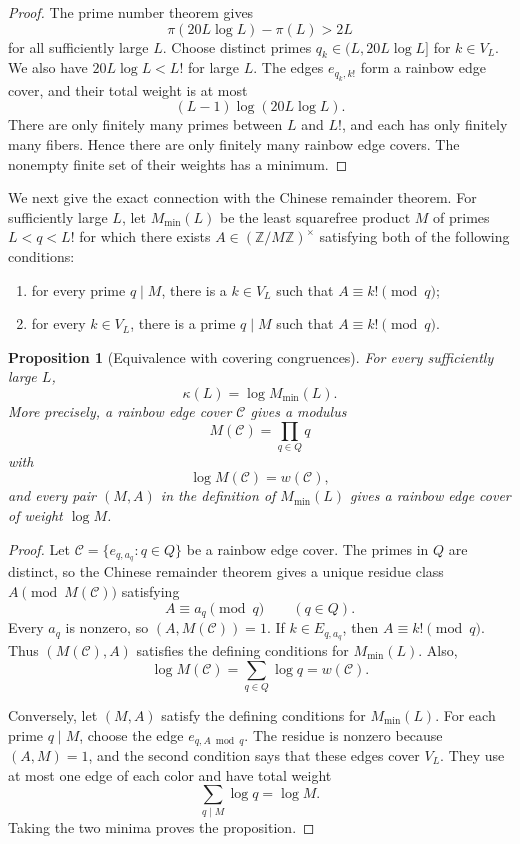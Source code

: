 \documentclass[11pt]{amsart}
\newtheorem{proposition}[theorem]{Proposition}
\theoremstyle{definition}
\theoremstyle{remark}
\begin{document}
\begin{proof}
The prime number theorem gives
\[
\pi(20L\log L)-\pi(L)>2L
\]
for all sufficiently large $L$.  Choose distinct primes
$q_k\in(L,20L\log L]$ for $k\in V_L$.  We also have
$20L\log L<L!$ for large $L$.  The edges $e_{q_k,k!}$ form a rainbow edge
cover, and their total weight is at most
\[
(L-1)\log(20L\log L).
\]
There are only finitely many primes between $L$ and $L!$, and each has only
finitely many fibers.  Hence there are only finitely many rainbow edge covers.
The nonempty finite set of their weights has a minimum.
\end{proof}

We next give the exact connection with the Chinese remainder theorem.  For
sufficiently large $L$, let $M_{\min}(L)$ be the least squarefree product
$M$ of primes $L<q<L!$ for which there exists
$A\in(\mathbb Z/M\mathbb Z)^\times$ satisfying both of the following
conditions:
\begin{enumerate}
\item for every prime $q\mid M$, there is a $k\in V_L$ such that
$A\equiv k!\pmod q$;
\item for every $k\in V_L$, there is a prime $q\mid M$ such that
$A\equiv k!\pmod q$.
\end{enumerate}

\begin{proposition}[Equivalence with covering congruences]
\label{prop:crt-equivalence}
For every sufficiently large $L$,
\[
\kappa(L)=\log M_{\min}(L).
\]
More precisely, a rainbow edge cover $\mathcal C$ gives a modulus
\[
M(\mathcal C)=\prod_{q\in Q}q
\]
with
\[
\log M(\mathcal C)=w(\mathcal C),
\]
and every pair $(M,A)$ in the definition of $M_{\min}(L)$ gives a rainbow
edge cover of weight $\log M$.
\end{proposition}

\begin{proof}
Let $\mathcal C=\{e_{q,a_q}:q\in Q\}$ be a rainbow edge cover.  The primes
in $Q$ are distinct, so the Chinese remainder theorem gives a unique residue class
$A\pmod {M(\mathcal C)}$ satisfying
\[
A\equiv a_q\pmod q\qquad(q\in Q).
\]
Every $a_q$ is nonzero, so $(A,M(\mathcal C))=1$.  If $k\in E_{q,a_q}$,
then $A\equiv k!\pmod q$.  Thus $(M(\mathcal C),A)$ satisfies the defining
conditions for $M_{\min}(L)$.  Also,
\[
\log M(\mathcal C)=\sum_{q\in Q}\log q
=w(\mathcal C).
\]

Conversely, let $(M,A)$ satisfy the defining conditions for $M_{\min}(L)$.
For each prime $q\mid M$, choose the edge $e_{q,A\bmod q}$.  The residue is
nonzero because $(A,M)=1$, and the second condition says that these edges
cover $V_L$.  They use at most one edge of each color and have total weight
\[
\sum_{q\mid M}\log q=\log M.
\]
Taking the two minima proves the proposition.
\end{proof}
\end{document}

